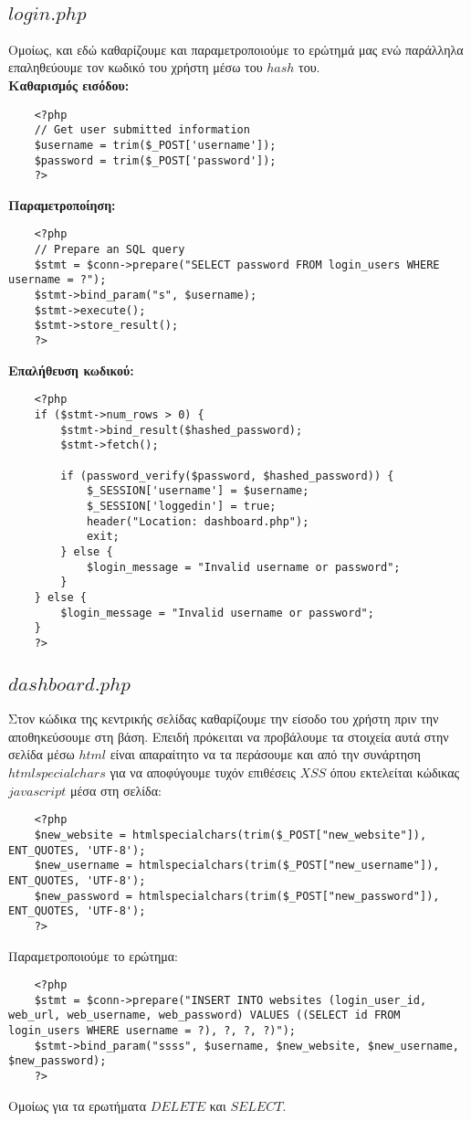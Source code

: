 \documentclass{report}
\begin{document}
\subsection*{$login.php$}
Ομοίως, και εδώ καθαρίζουμε και παραμετροποιούμε το ερώτημά μας ενώ παράλληλα επαληθεύουμε
τον κωδικό του χρήστη μέσω του $hash$ του.\\
\textbf{Καθαρισμός εισόδου:}
\begin{verbatim}
    <?php
    // Get user submitted information
    $username = trim($_POST['username']);
    $password = trim($_POST['password']);
    ?>
\end{verbatim}
\textbf{Παραμετροποίηση:}
\begin{verbatim}
    <?php
    // Prepare an SQL query
    $stmt = $conn->prepare("SELECT password FROM login_users WHERE username = ?");
    $stmt->bind_param("s", $username);
    $stmt->execute();
    $stmt->store_result();
    ?>
\end{verbatim}
\textbf{Επαλήθευση κωδικού:}
\begin{verbatim}
    <?php
    if ($stmt->num_rows > 0) {
        $stmt->bind_result($hashed_password);
        $stmt->fetch();

        if (password_verify($password, $hashed_password)) {
            $_SESSION['username'] = $username;
            $_SESSION['loggedin'] = true;
            header("Location: dashboard.php");
            exit;
        } else {
            $login_message = "Invalid username or password";
        }
    } else {
        $login_message = "Invalid username or password";
    }
    ?>
\end{verbatim}
\subsection*{$dashboard.php$}
Στον κώδικα της κεντρικής σελίδας καθαρίζουμε την είσοδο του χρήστη πριν την αποθηκεύσουμε στη βάση.
Επειδή πρόκειται να προβάλουμε τα στοιχεία αυτά στην σελίδα μέσω $html$ είναι απαραίτητο να τα περάσουμε 
και από την συνάρτηση $htmlspecialchars$ για να αποφύγουμε τυχόν επιθέσεις $XSS$ όπου εκτελείται κώδικας
$javascript$ μέσα στη σελίδα:
\begin{verbatim}
    <?php
    $new_website = htmlspecialchars(trim($_POST["new_website"]), ENT_QUOTES, 'UTF-8');
    $new_username = htmlspecialchars(trim($_POST["new_username"]), ENT_QUOTES, 'UTF-8');
    $new_password = htmlspecialchars(trim($_POST["new_password"]), ENT_QUOTES, 'UTF-8');
    ?>
\end{verbatim}
Παραμετροποιούμε το ερώτημα:
\begin{verbatim}
    <?php
    $stmt = $conn->prepare("INSERT INTO websites (login_user_id, web_url, web_username, web_password) VALUES ((SELECT id FROM login_users WHERE username = ?), ?, ?, ?)");
    $stmt->bind_param("ssss", $username, $new_website, $new_username, $new_password);
    ?>
\end{verbatim}
Ομοίως για τα ερωτήματα $DELETE$ και $SELECT$.
\end{document}
